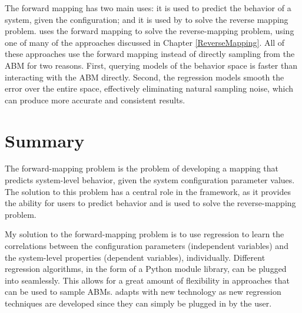 The forward mapping has two main uses: it is used to predict the behavior of a system, given the configuration; and it is used by \fw to solve the reverse mapping problem.
\fw uses the forward mapping to solve the reverse-mapping problem, using one of many of the approaches discussed in Chapter \ref{ReverseMapping}.
All of these approaches use the forward mapping instead of directly sampling from the ABM for two reasons.
First, querying models of the behavior space is faster than interacting with the ABM directly.
Second, the regression models smooth the error over the entire space, effectively eliminating natural sampling noise, which can produce more accurate and consistent results.



\section{Summary}

The forward-mapping problem is the problem of developing a mapping that predicts system-level behavior, given the system configuration parameter values.
The solution to this problem has a central role in the framework, as it provides the ability for users to predict behavior and is used to solve the reverse-mapping problem.

My solution to the forward-mapping problem is to use regression to learn the correlations between the configuration parameters (independent variables) and the system-level properties (dependent variables), individually.
Different regression algorithms, in the form of a Python module library, can be plugged into \fw seamlessly.
This allows for a great amount of flexibility in approaches that can be used to sample ABMs.
\fw adapts with new technology as new regression techniques are developed since they can simply be plugged in by the user.








